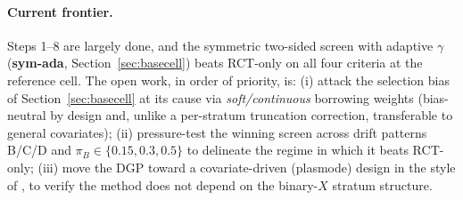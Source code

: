 \documentclass[11pt]{article}
\begin{document}
\paragraph{Current frontier.}
Steps 1--8 are largely done, and the symmetric two-sided screen with adaptive $\gamma$ (\textbf{sym-ada}, Section~\ref{sec:basecell}) beats RCT-only on all four criteria at the reference cell. The open work, in order of priority, is: (i) attack the selection bias of Section~\ref{sec:basecell} at its cause via \emph{soft/continuous} borrowing weights (bias-neutral by design and, unlike a per-stratum truncation correction, transferable to general covariates); (ii) pressure-test the winning screen across drift patterns B/C/D and $\pi_B\in\{0.15,0.3,0.5\}$ to delineate the regime in which it beats RCT-only; (iii) move the DGP toward a covariate-driven (plasmode) design in the style of \citet{zhou2025causal}, to verify the method does not depend on the binary-$X$ stratum structure.
\end{document}
